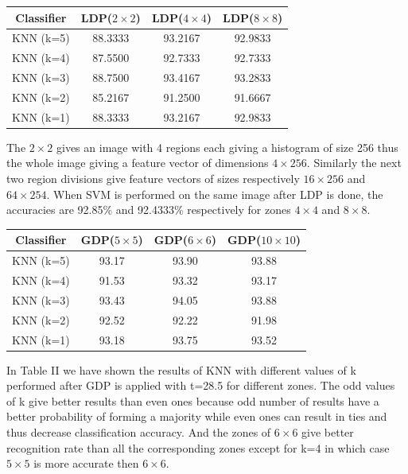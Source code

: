 \documentclass[conference]{IEEEtran}
\begin{document}
\begin{center}
	\begin{tabular}{cccc}
		\hline
		Classifier & LDP($2\times2$) & LDP($4\times4$) & LDP($8\times8$) \\
		\hline
		KNN (k=5) & 88.3333 & 93.2167 & 92.9833\\
		KNN (k=4) & 87.5500 & 92.7333 & 92.7333\\
		KNN (k=3) & 88.7500 & 93.4167 & 93.2833\\
		KNN (k=2) & 85.2167 & 91.2500 & 91.6667\\
		KNN (k=1) & 88.3333 & 93.2167 & 92.9833\\
		\hline
	\end{tabular}
\end{center}


The $2\times2$ gives an image with 4 regions each giving a histogram of size 256 thus the whole image giving a feature vector of dimensions $4\times256$. Similarly the next two region divisions give feature vectors of sizes respectively $16\times256$ and $64\times254$.
When SVM is performed on the same image after LDP is done, the accuracies are 92.85\% and 92.4333\% respectively for zones $4\times4$ and $8\times8$.
\begin{center}
	\begin{tabular}{cccc}
		\hline
		Classifier & GDP($5\times5$) & GDP($6\times6$) & GDP($10\times10$)\\
		\hline
		KNN (k=5) & 93.17 & 93.90 & 93.88\\
		KNN (k=4) & 91.53 & 93.32 & 93.17\\
		KNN (k=3) & 93.43 & 94.05 & 93.88\\
		KNN (k=2) & 92.52 & 92.22 & 91.98\\
		KNN (k=1) & 93.18 & 93.75 & 93.52\\
		\hline
	\end{tabular}
\end{center}


In Table II we have shown the results of KNN with different values of k performed after GDP is applied with t=28.5 for different zones. The odd values of k give better results than even ones because odd number of results have a better probability of forming a majority while even ones can result in ties and thus decrease classification accuracy. And the zones of $6\times6$ give better recognition rate than all the corresponding zones except for k=4 in which case $5\times5$ is more accurate then $6\times6$.
\end{document}
